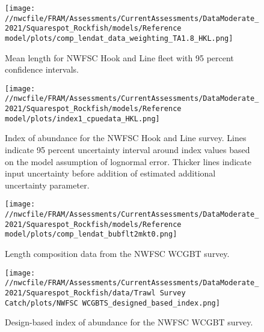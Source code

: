 \documentclass[11pt,
  english,
  a4paper,
]{article}
\begin{document}
\begin{figure}
\centering
\texttt{[image: //nwcfile/FRAM/Assessments/CurrentAssessments/DataModerate\_2021/Squarespot\_Rockfish/models/Reference model/plots/comp\_lendat\_data\_weighting\_TA1.8\_HKL.png]}
\caption{Mean length for NWFSC Hook and Line fleet with 95 percent confidence intervals.\label{fig:mean-hkl-len-data}}
\end{figure}

\tagmcend\tagstructend


\begin{figure}
\centering
\texttt{[image: //nwcfile/FRAM/Assessments/CurrentAssessments/DataModerate\_2021/Squarespot\_Rockfish/models/Reference model/plots/index1\_cpuedata\_HKL.png]}
\caption{Index of abundance for the NWFSC Hook and Line survey. Lines indicate 95 percent uncertainty interval around index values based on the model assumption of lognormal error. Thicker lines indicate input uncertainty before addition of estimated additional uncertainty parameter.\label{fig:hkl-index}}
\end{figure}

\tagmcend\tagstructend


\begin{figure}
\centering
\texttt{[image: //nwcfile/FRAM/Assessments/CurrentAssessments/DataModerate\_2021/Squarespot\_Rockfish/models/Reference model/plots/comp\_lendat\_bubflt2mkt0.png]}
\caption{Length composition data from the NWFSC WCGBT survey.\label{fig:wcgbts-len-data}}
\end{figure}

\tagmcend\tagstructend


\begin{figure}
\centering
\texttt{[image: //nwcfile/FRAM/Assessments/CurrentAssessments/DataModerate\_2021/Squarespot\_Rockfish/data/Trawl Survey Catch/plots/NWFSC WCGBTS\_designed\_based\_index.png]}
\caption{Design-based index of abundance for the NWFSC WCGBT survey.\label{fig:wcgbts-dbindex}}
\end{figure}
\end{document}
